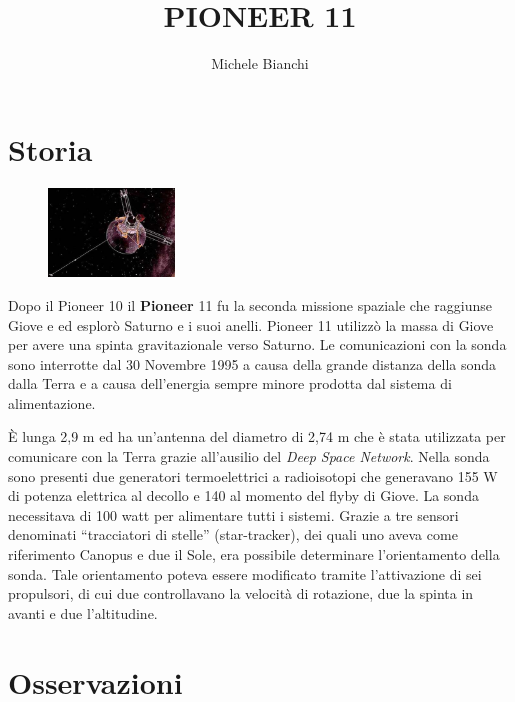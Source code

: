 \documentclass[12pt,a4paper]{article}
\begin{document}
\title{\vspace{-70pt}PIONEER 11}
\author{Michele Bianchi}
\date{}
\maketitle
\pagestyle{empty}
\thispagestyle{empty}

\section*{Storia}
\label{storia}
\begin{figure}
  \vspace{-10pt}
  \begin{center}
    \includegraphics[width=0.30\textwidth]{satellite}
  \end{center}
  \vspace{-20pt}
\end{figure}
Dopo il Pioneer 10 il \textbf{Pioneer} 11 fu la seconda missione spaziale che raggiunse Giove e ed esplorò Saturno e i suoi anelli. Pioneer 11 utilizzò la massa di Giove per avere una spinta gravitazionale verso Saturno. Le comunicazioni con la sonda sono interrotte dal 30 Novembre 1995 a causa della grande distanza della sonda dalla Terra e a causa dell'energia sempre minore prodotta dal sistema di alimentazione.

È lunga 2,9 m ed ha un'antenna del diametro di 2,74 m che è stata utilizzata per comunicare con la Terra grazie all'ausilio del \emph{Deep Space Network}. Nella sonda sono presenti due generatori termoelettrici a radioisotopi che generavano 155 W di potenza elettrica al decollo e 140 al momento del flyby di Giove. La sonda necessitava di 100 watt per alimentare tutti i sistemi. Grazie a tre sensori denominati ``tracciatori di stelle'' (star-tracker), dei quali uno aveva come riferimento Canopus e due il Sole, era possibile determinare l'orientamento della sonda. Tale orientamento poteva essere modificato tramite l'attivazione di sei propulsori, di cui due controllavano la velocità di rotazione, due la spinta in avanti e due l'altitudine.

\section*{Osservazioni}
\label{osservazioni}
\end{document}
